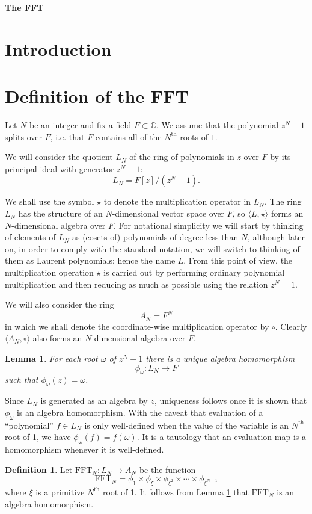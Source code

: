 \documentclass[12pt, letter, oneside]{amsart}
\theoremstyle{definition}
\newtheorem{definition}[para]{Definition}
\theoremstyle{plain}
\newtheorem{lemma}[para]{Lemma}
\numberwithin{equation}{para}
\numberwithin{figure}{section}
\newcommand{\CC}{\mathbb{C}}
\newcommand{\FFT}{\text{FFT}}
\renewcommand{\th}{\text{th}}
\begin{document}
\centerline{\Large\bf The FFT}
\bigskip
\section{Introduction}
\section{Definition of the FFT}
Let $N$ be an integer and fix a field $F\subset\CC$.  We assume that the
polynomial $z^N - 1$ splits over $F$, i.e. that $F$ contains all of
the $N^\th$ roots of $1$.

We will consider the quotient $L_N$ of the ring of polynomials in $z$
over $F$ by its principal ideal with generator $z^N - 1$:
$$L_N = F[z]/(z^N-1).$$

We shall use the symbol $\star$ to denote the multiplication operator
in $L_N$.  The ring $L_N$ has the structure of an $N$-dimensional
vector space over $F$, so $\langle L, \star\rangle$ forms an
$N$-dimensional algebra over $F$.  For notational simplicity we will
start by thinking of elements of $L_N$ as (cosets of) polynomials of
degree less than $N$, although later on, in order to comply with the
standard notation, we will switch to thinking of them as Laurent
polynomials; hence the name $L$.  From this point of view, the
multiplication operation $\star$ is carried out by performing ordinary
polynomial multiplication and then reducing as much as possible using
the relation $z^N = 1$.

We will also consider the ring $$A_N = F^N$$ in which we shall denote
the coordinate-wise multiplication operator by $\circ$.  Clearly
$\langle A_N, \circ\rangle$ also forms an $N$-dimensional algebra over
$F$.

\begin{lemma}\label{lemma:evaluation}
For each root $\omega$ of $z^N - 1$ there is a unique algebra
homomorphism
$$\phi_\omega:L_N \to F$$
such that $\phi_\omega(z) = \omega$.
\end{lemma}
\proof Since $L_N$ is generated as an algebra by $z$, uniqueness
follows once it is shown that $\phi_\omega$ is an algebra
homomorphism.  With the caveat that evaluation of a ``polynomial''
$f\in L_N$ is only well-defined when the value of the variable is an
$N^\th$ root of 1, we have $\phi_\omega(f) = f(\omega)$.  It is a
tautology that an evaluation map is a homomorphism whenever it is
well-defined.
\endproof

\begin{definition}\label{definition:fft}
  Let $\FFT_N:L_N \to A_N$ be the function
 $$\FFT_N = \phi_1 \times \phi_\xi \times \phi_{\xi^2} \times \cdots
 \times \phi_{\xi^{N-1}}$$
 where $\xi$ is a primitive $N^\th$ root of 1.  It follows from
 Lemma \ref{lemma:evaluation} that $\FFT_N$ is an algebra homomorphism.
\end{definition}
\end{document}
